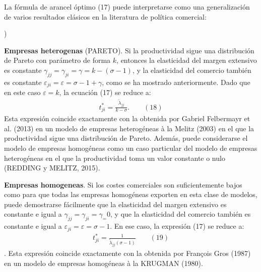 \documentclass[10pt,a4paper]{article}
\newcounter{alphaitem}
\newenvironment{la}
      {\begin{list}{\alph{alphaitem})}{%
          \usecounter{alphaitem}%
          \setlength{\leftmargin}{1cm}%
          \setlength{\parskip}{3pt}%
          \setlength{\itemsep}{0pt}%
          \setlength{\parsep}{0pt}%
      }}
      {\end{list}}
\begin{document}
La fórmula de arancel óptimo (17) puede interpretarse como una generalización de varios resultados clásicos en la literatura de política comercial:
\begin{la}
    \item \textbf{Empresas heterogenas} (PARETO). Si la productividad sigue una distribución de Pareto con parámetro de forma $k$, entonces la elasticidad del margen extensivo es constante $\gamma_{jj} = \gamma_{ji} = \gamma = k - (\sigma - 1)$, y la elasticidad del comercio también es constante $\varepsilon_{ji} = \varepsilon = \sigma - 1 + \gamma$, como se ha mostrado anteriormente. Dado que en este caso $\varepsilon = k$, la ecuación (17) se reduce a:
    $$\begin{aligned}
    t_{ji}^* =\frac{\tilde{\lambda}_{jj}}{k - \sigma}.\qquad(18)
    \end{aligned}$$
    Esta expresión coincide exactamente con la obtenida por Gabriel Felbermayr et al. (2013) en un modelo de empresas heterogéneas à la Melitz (2003) en el que la productividad sigue una distribución de Pareto. Además, puede considerarse el modelo de empresas homogéneas como un caso particular del modelo de empresas heterogéneas en el que la productividad toma un valor constante o nulo (REDDING y MELITZ, 2015).
    \item \textbf{Empresas homogeneas}. Si los costes comerciales son suficientemente bajos como para que todas las empresas homogéneas exporten en esta clase de modelos, puede demostrarse fácilmente que la elasticidad del margen extensivo es constante e igual a $\gamma_{jj} = \gamma_{ji} = \gamma_ = 0$, y que la elasticidad del comercio también es constante e igual a $\varepsilon_{ji} = \varepsilon = \sigma - 1$. En ese caso, la expresión (17) se reduce a:
    $$\begin{aligned}
    t_{ji}^* = \frac{1}{\tilde{\lambda}_{jj}(\sigma - 1)}\qquad (19)
    \end{aligned}$$.
    Esta expresión coincide exactamente con la obtenida por François Gros (1987) en un modelo de empresas homogéneas à la KRUGMAN (1980).
\end{la}
\end{document}
